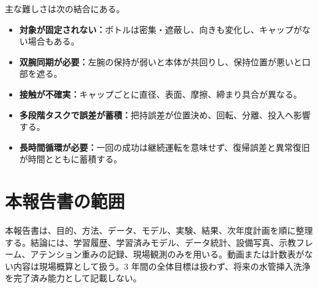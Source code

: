 
主な難しさは次の結合にある。

\begin{itemize}
  \item \textbf{対象が固定されない：}ボトルは密集・遮蔽し、向きも変化し、キャップがない場合もある。
  \item \textbf{双腕同期が必要：}左腕の保持が弱いと本体が共回りし、保持位置が悪いと口部を遮る。
  \item \textbf{接触が不確実：}キャップごとに直径、表面、摩擦、締まり具合が異なる。
  \item \textbf{多段階タスクで誤差が蓄積：}把持誤差が位置決め、回転、分離、投入へ影響する。
  \item \textbf{長時間循環が必要：}一回の成功は継続運転を意味せず、復帰誤差と異常復旧が時間とともに蓄積する。
\end{itemize}

\section{本報告書の範囲}

本報告書は、目的、方法、データ、モデル、実験、結果、次年度計画を順に整理する。結論には、学習履歴、学習済みモデル、データ統計、設備写真、示教フレーム、アテンション重みの記録、現場観測のみを用いる。動画または計数表がない内容は現場概算として扱う。3 年間の全体目標は扱わず、将来の水管挿入洗浄を完了済み能力として記載しない。
